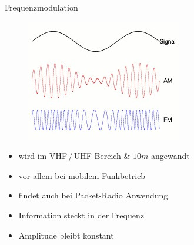 \begin{frame}{Frequenzmodulation}
  \begin{center}
    \begin{figure}
      \includegraphics[width=\textwidth,height=.4\textheight,keepaspectratio]{e14/modulationen.jpg}
    \end{figure}
    \begin{itemize}
      \item wird im VHF\,/\,UHF Bereich \& $10m$ angewandt
      \item vor allem bei mobilem Funkbetrieb
      \item findet auch bei Packet-Radio Anwendung
      \item Information steckt in der Frequenz
      \item Amplitude bleibt konstant
    \end{itemize}
  \end{center}
\end{frame}

